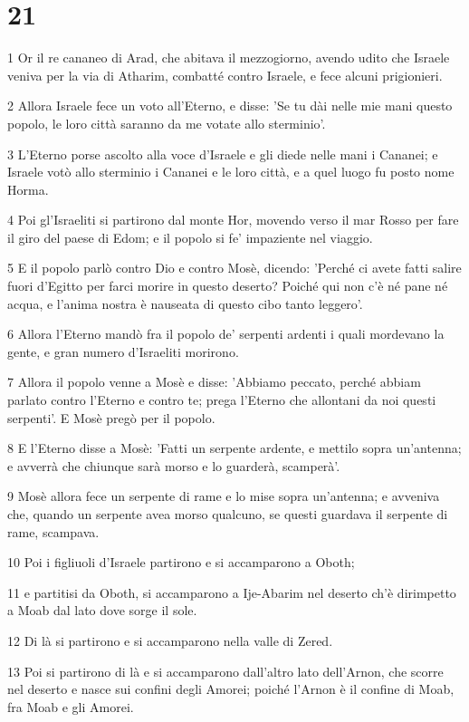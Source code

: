 \chapter{21}

\par 1 Or il re cananeo di Arad, che abitava il mezzogiorno, avendo udito che Israele veniva per la via di Atharim, combatté contro Israele, e fece alcuni prigionieri.
\par 2 Allora Israele fece un voto all'Eterno, e disse: 'Se tu dài nelle mie mani questo popolo, le loro città saranno da me votate allo sterminio'.
\par 3 L'Eterno porse ascolto alla voce d'Israele e gli diede nelle mani i Cananei; e Israele votò allo sterminio i Cananei e le loro città, e a quel luogo fu posto nome Horma.
\par 4 Poi gl'Israeliti si partirono dal monte Hor, movendo verso il mar Rosso per fare il giro del paese di Edom; e il popolo si fe' impaziente nel viaggio.
\par 5 E il popolo parlò contro Dio e contro Mosè, dicendo: 'Perché ci avete fatti salire fuori d'Egitto per farci morire in questo deserto? Poiché qui non c'è né pane né acqua, e l'anima nostra è nauseata di questo cibo tanto leggero'.
\par 6 Allora l'Eterno mandò fra il popolo de' serpenti ardenti i quali mordevano la gente, e gran numero d'Israeliti morirono.
\par 7 Allora il popolo venne a Mosè e disse: 'Abbiamo peccato, perché abbiam parlato contro l'Eterno e contro te; prega l'Eterno che allontani da noi questi serpenti'. E Mosè pregò per il popolo.
\par 8 E l'Eterno disse a Mosè: 'Fatti un serpente ardente, e mettilo sopra un'antenna; e avverrà che chiunque sarà morso e lo guarderà, scamperà'.
\par 9 Mosè allora fece un serpente di rame e lo mise sopra un'antenna; e avveniva che, quando un serpente avea morso qualcuno, se questi guardava il serpente di rame, scampava.
\par 10 Poi i figliuoli d'Israele partirono e si accamparono a Oboth;
\par 11 e partitisi da Oboth, si accamparono a Ije-Abarim nel deserto ch'è dirimpetto a Moab dal lato dove sorge il sole.
\par 12 Di là si partirono e si accamparono nella valle di Zered.
\par 13 Poi si partirono di là e si accamparono dall'altro lato dell'Arnon, che scorre nel deserto e nasce sui confini degli Amorei; poiché l'Arnon è il confine di Moab, fra Moab e gli Amorei.
